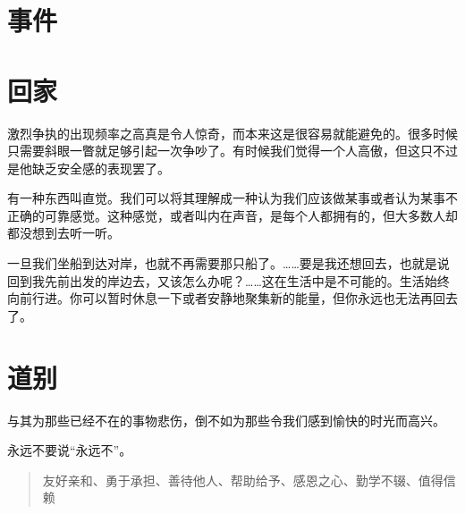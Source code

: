\documentclass{ctexart}
\begin{document}
\section{事件}

\section{回家}

激烈争执的出现频率之高真是令人惊奇，而本来这是很容易就能避免的。很多时候只需要斜眼一瞥就足够引起一次争吵了。有时候我们觉得一个人高傲，但这只不过是他缺乏安全感的表现罢了。

有一种东西叫直觉。我们可以将其理解成一种认为我们应该做某事或者认为某事不正确的可靠感觉。这种感觉，或者叫内在声音，是每个人都拥有的，但大多数人却都没想到去听一听。

一旦我们坐船到达对岸，也就不再需要那只船了。……要是我还想回去，也就是说回到我先前出发的岸边去，又该怎么办呢？……这在生活中是不可能的。生活始终向前行进。你可以暂时休息一下或者安静地聚集新的能量，但你永远也无法再回去了。

\section{道别}

与其为那些已经不在的事物悲伤，倒不如为那些令我们感到愉快的时光而高兴。

永远不要说“永远不”。

\begin{quote}
    友好亲和、勇于承担、善待他人、帮助给予、感恩之心、勤学不辍、值得信赖
\end{quote}
\end{document}
